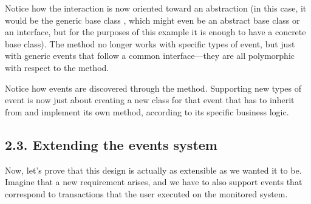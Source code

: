 \documentclass[a4paper,10pt,english]{sphinxmanual}
\begin{document}
\begin{sphinxVerbatim}[commandchars=\\\{\}]
 
      
          

     
           
                 
                     

             

         
\end{sphinxVerbatim}

Notice how the interaction is now oriented toward an abstraction (in this case, it would be
the generic base class , which might even be an abstract base class or an interface, but
for the purposes of this example it is enough to have a concrete base class). The method no
longer works with specific types of event, but just with generic events that follow a
common interface—they are all polymorphic with respect to the  method.

Notice how events are discovered through the  method. Supporting
new types of event is now just about creating a new class for that event that has to inherit
from  and implement its own  method, according to its specific
business logic.


\subsection{2.3. Extending the events system}
\label{\detokenize{chapters/4_solid_principles/index:extending-the-events-system}}
Now, let’s prove that this design is actually as extensible as we wanted it to be. Imagine that
a new requirement arises, and we have to also support events that correspond to
transactions that the user executed on the monitored system.
\end{document}
